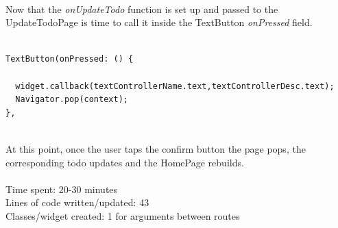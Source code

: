 \mbox{}\\
Now that the \textit{onUpdateTodo } function is set up and  passed to the UpdateTodoPage is  time to call it inside the TextButton \textit{onPressed  }field.
\mbox{}\\
\begin{code}

\begin{verbatim}

TextButton(onPressed: () {

  widget.callback(textControllerName.text,textControllerDesc.text);
  Navigator.pop(context);
},
\end{verbatim}
\end{code}
\mbox{}\\
At this point, once the user taps the confirm button the page pops, the corresponding todo updates and the HomePage rebuilds.\\
\\
Time spent: 20-30 minutes\\
Lines of code written/updated: 43\\ 
Classes/widget created: 1 for arguments between routes\\


